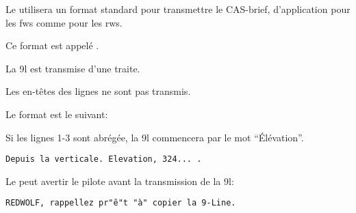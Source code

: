 Le \ja{} utilisera un format standard pour transmettre le CAS-brief, d'application pour les \glspl{fw} comme pour les \glspl{rw}.

Ce format est appelé .

La \gls{9l} est transmise d'une traite.

Les en-têtes des lignes ne sont pas transmis.

Le format est le suivant:



\begin{minipage}{\linewidth}
	Si les lignes 1-3 sont abrégée, la \gls{9l} commencera par le mot ``Élévation''.
	\begin{lstlisting}[caption=9-Line: lignes 1-3 abbrégée, label=9labbr]
	Depuis la verticale. Elevation, 324... .
	\end{lstlisting}
\end{minipage}
	


\begin{minipage}{\linewidth}	
	Le \ja{} peut avertir le pilote avant la transmission de la \gls{9l}:	
	\begin{lstlisting}[caption=9-Line: avertissement, label=9loavert]
	REDWOLF, rappellez pr"ê"t "à" copier la 9-Line.
	\end{lstlisting}
\end{minipage}
	
